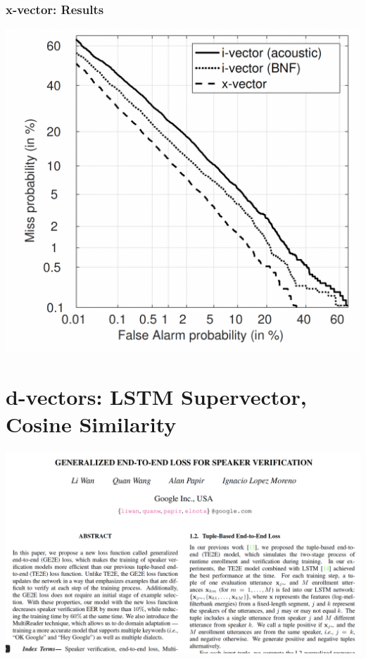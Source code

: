 \documentclass{beamer}
\begin{document}
\begin{frame}
  \frametitle{x-vector: Results}

  \centerline{\includegraphics[height=0.8\textheight]{figs/snyder2018fig2.png}}
\end{frame}

\section[d-vectors]{d-vectors: LSTM Supervector, Cosine Similarity}
\setcounter{subsection}{1}

\begin{frame}
  \centerline{\includegraphics[width=\textwidth]{figs/wan2018page1.png}}
\end{frame}
\end{document}
